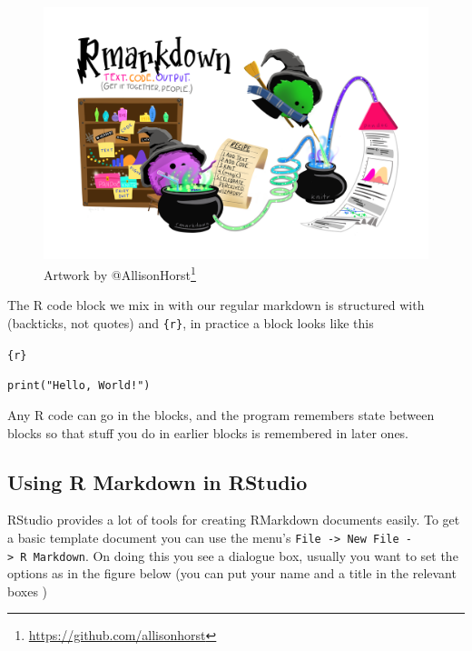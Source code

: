 \documentclass[
]{book}
\renewcommand{\href}[2]{#2\footnote{\url{#1}}}
\begin{document}
\begin{figure}
\centering
\includegraphics{fig/rmarkdown_wizards.png}
\caption{\label{fig:unnamed-chunk-4}Artwork by \href{https://github.com/allisonhorst}{@AllisonHorst}}
\end{figure}

The R code block we mix in with our regular markdown is structured with \texttt{\textasciigrave{}\textasciigrave{}\textasciigrave{}} (backticks, not quotes) and \texttt{\{r\}}, in practice a block looks like this

\texttt{\textasciigrave{}\textasciigrave{}\textasciigrave{}\{r\}}

\texttt{print("Hello,\ World!")}

\texttt{\textasciigrave{}\textasciigrave{}\textasciigrave{}}

Any R code can go in the blocks, and the program remembers state between blocks so that stuff you do in earlier blocks is remembered in later ones.

\hypertarget{using-r-markdown-in-rstudio}{%
\subsection{Using R Markdown in RStudio}\label{using-r-markdown-in-rstudio}}

RStudio provides a lot of tools for creating RMarkdown documents easily. To get a basic template document you can use the menu's \texttt{File\ -\textgreater{}\ New\ File\ -\textgreater{}\ R\ Markdown}. On doing this you see a dialogue box, usually you want to set the options as in the figure below (you can put your name and a title in the relevant boxes )
\end{document}
